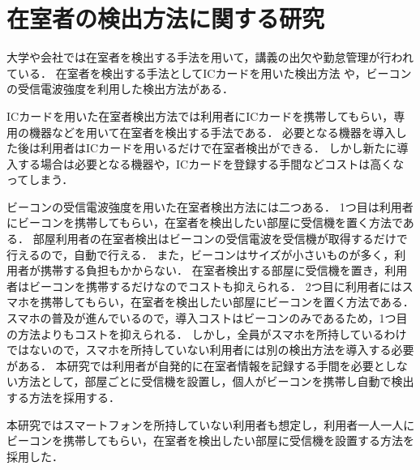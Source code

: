 \section{在室者の検出方法に関する研究}\label{2.2}
大学や会社では在室者を検出する手法を用いて，講義の出欠\cite{smartphone}\cite{nfcandroid}\cite{android}\cite{smartbase}\cite{garake}や勤怠管理\cite{amano}が行われている．
在室者を検出する手法としてICカードを用いた検出方法
\cite{zyugyou}
\cite{felica}
\cite{densi}
\cite{notouchic}
\cite{felicaweb}
\cite{suica}
や，ビーコンの受信電波強度を利用した検出方法\cite{bledakoku}\cite{blesuitei}がある．

ICカードを用いた在室者検出方法では利用者にICカードを携帯してもらい，専用の機器などを用いて在室者を検出する手法である．
必要となる機器を導入した後は利用者はICカードを用いるだけで在室者検出ができる．
しかし新たに導入する場合は必要となる機器や，ICカードを登録する手間などコストは高くなってしまう．

ビーコンの受信電波強度を用いた在室者検出方法には二つある．
1つ目は利用者にビーコンを携帯してもらい，在室者を検出したい部屋に受信機を置く方法である．
部屋利用者の在室者検出はビーコンの受信電波を受信機が取得するだけで行えるので，自動で行える．
また，ビーコンはサイズが小さいものが多く，利用者が携帯する負担もかからない．
在室者検出する部屋に受信機を置き，利用者はビーコンを携帯するだけなのでコストも抑えられる．
2つ目に利用者にはスマホを携帯してもらい，在室者を検出したい部屋にビーコンを置く方法である．
スマホの普及が進んでいる\cite{hukyu}ので，導入コストはビーコンのみであるため，1つ目の方法よりもコストを抑えられる．
しかし，全員がスマホを所持しているわけではないので，スマホを所持していない利用者には別の検出方法を導入する必要がある．
本研究では利用者が自発的に在室者情報を記録する手間を必要としない方法として，部屋ごとに受信機を設置し，個人がビーコンを携帯し自動で検出する方法を採用する．




本研究ではスマートフォンを所持していない利用者も想定し，利用者一人一人にビーコンを携帯してもらい，在室者を検出したい部屋に受信機を設置する方法を採用した．

